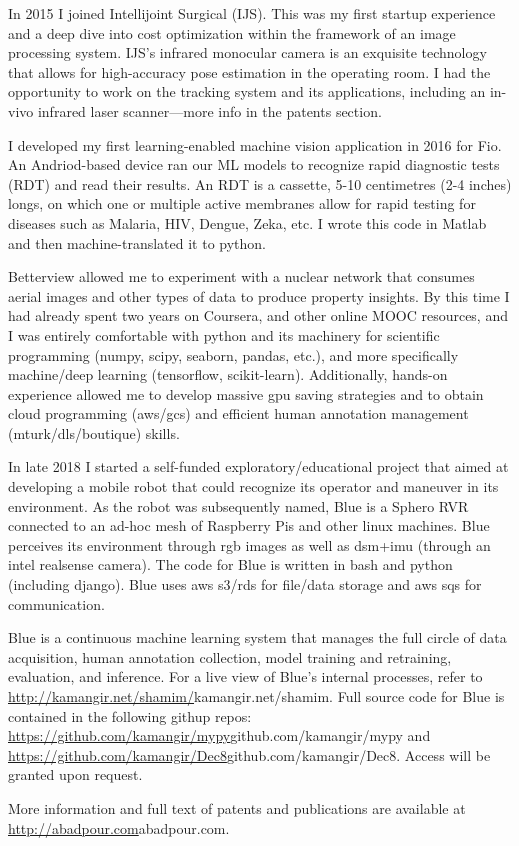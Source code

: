 \vspace{0.5cm}
In 2015 I joined Intellijoint Surgical (IJS). This was my first startup experience and a deep dive into cost optimization within the framework of an image processing system. IJS's infrared monocular camera is an exquisite technology that allows for high-accuracy pose estimation in the operating room. I had the opportunity to work on the tracking system and its applications, including an in-vivo infrared laser scanner—more info in the patents section.

\vspace{0.5cm}
I developed my first learning-enabled machine vision application in 2016 for Fio. An Andriod-based device ran our ML models to recognize rapid diagnostic tests (RDT) and read their results. An RDT is a cassette, 5-10 centimetres (2-4 inches) longs, on which one or multiple active membranes allow for rapid testing for diseases such as Malaria, HIV, Dengue, Zeka, etc. I wrote this code in Matlab and then machine-translated it to python. 

\vspace{0.5cm}
Betterview allowed me to experiment with a nuclear network that consumes aerial images and other types of data to produce property insights. By this time I had already spent two years on Coursera, and other online MOOC resources, and I was entirely comfortable with python and its machinery for scientific programming (numpy, scipy, seaborn, pandas, etc.), and more specifically machine/deep learning (tensorflow, scikit-learn). Additionally, hands-on experience allowed me to develop massive gpu saving strategies and to obtain cloud programming (aws/gcs) and efficient human annotation management (mturk/dls/boutique) skills.

\vspace{0.5cm}
In late 2018 I started a self-funded exploratory/educational project that aimed at developing a mobile robot that could recognize its operator and maneuver in its environment. As the robot was subsequently named, Blue is a Sphero RVR connected to an ad-hoc mesh of Raspberry Pis and other linux machines. Blue perceives its environment through rgb images as well as dsm+imu (through an intel realsense camera). The code for Blue is written in bash and python (including django). Blue uses aws s3/rds for file/data storage and aws sqs for communication. 

\vspace{0.5cm}
Blue is a continuous machine learning system that manages the full circle of data acquisition, human annotation collection, model training and retraining, evaluation, and inference. For a live view of Blue's internal processes, refer to \url{http://kamangir.net/shamim/}{kamangir.net/shamim}. Full source code for Blue is contained in the following githup repos: \url{https://github.com/kamangir/mypy}{github.com/kamangir/mypy} and \url{https://github.com/kamangir/Dec8}{github.com/kamangir/Dec8}. Access will be granted upon request.

\vspace{0.5cm}
More information and full text of patents and publications are available at \url{http://abadpour.com}{abadpour.com}.

\vspace{1.5cm}
